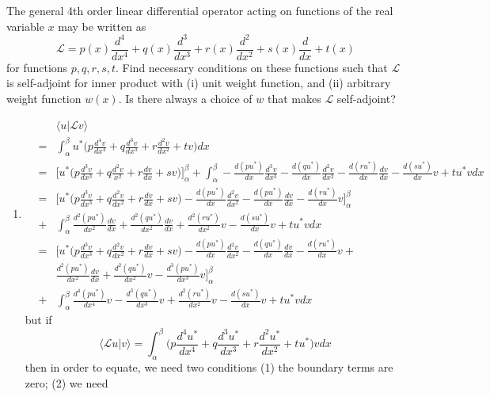 \documentclass[a4paper]{article}
\begin{document}
\begin{qns}
The general 4th order linear differential operator acting on functions of the real variable $x$ may be written as
$$\mathcal{L}=p(x)\frac{d^4}{dx^4}+q(x)\frac{d^3}{dx^3}+r(x)\frac{d^2}{dx^2}+s(x)\frac{d}{dx}+t(x)$$
for functions $p,q,r,s,t$. Find necessary conditions on these functions such that $\mathcal{L}$ is self-adjoint for inner product with (i) unit weight function, and (ii) arbitrary weight function $w(x)$. Is there always a choice of $w$ that makes $\mathcal{L}$ self-adjoint?
\end{qns}
\begin{ans}\leavevmode
\begin{enumerate}[label=(\roman*)]
\item
\begin{eqnarray}
& &\langle u|\mathcal{L}v\rangle\nonumber\\&=&\int_\alpha^\beta u^*\bigg(p\frac{d^4v}{dx^4}+q\frac{d^3v}{dx^3}+r\frac{d^2v}{dx^2}+tv\bigg)dx\nonumber\\&=&\bigg[u^*\bigg(p\frac{d^3v}{dx^3}+q\frac{d^2v}{x^2}+r\frac{dv}{dx}+sv\bigg)\bigg]_\alpha^\beta+\int_\alpha^\beta-\frac{d(pu^*)}{dx}\frac{d^3v}{dx^3}-\frac{d(qu^*)}{dx}\frac{d^2v}{dx^2}-\frac{d(ru^*)}{dx}\frac{dv}{dx}-\frac{d(su^*)}{dx}v+tu^*vdx\nonumber\\&=&\bigg[u^*\bigg(p\frac{d^3v}{dx^3}+q\frac{d^2v}{dx^2}+r\frac{dv}{dx}+sv\bigg)-\frac{d(pu^*)}{dx}\frac{d^2v}{dx^2}-\frac{d(pu^*)}{dx}\frac{dv}{dx}-\frac{d(ru^*)}{dx}v\bigg]_\alpha^\beta\nonumber\\&+&\int_\alpha^\beta\frac{d^2(pu^*)}{dx^2}\frac{dv}{dx}+\frac{d^2(qu^*)}{dx^2}\frac{dv}{dx}+\frac{d^2(ru^*)}{dx^2}v-\frac{d(su^*)}{dx}v+tu^*vdx\nonumber\\&=&\bigg[u^*\bigg(p\frac{d^3v}{dx^3}+q\frac{d^2v}{dx^2}+r\frac{dv}{dx}+sv\bigg)-\frac{d(pu^*)}{dx}\frac{d^2v}{dx^2}-\frac{d(qu^*)}{dx}\frac{dv}{dx}-\frac{d(ru^*)}{dx}v+\nonumber\\&&\frac{d^2(pu^*)}{dx^2}\frac{dv}{dx}+\frac{d^2(qu^*)}{dx^2}v-\frac{d^3(pu^*)}{dx^3}v\bigg]_\alpha^\beta\nonumber\\&+&\int_\alpha^\beta\frac{d^4(pu^*)}{dx^4}v-\frac{d^3(qu^*)}{dx^3}v+\frac{d^2(ru^*)}{dx^2}v-\frac{d(su^*)}{dx}v+tu^*vdx\nonumber
\end{eqnarray}
but if
$$\langle\mathcal{L}u|v\rangle=\int_\alpha^\beta\bigg(p\frac{d^4u^*}{dx^4}+q\frac{d^3u^*}{dx^3}+r\frac{d^2u^*}{dx^2}+tu^*\bigg)vdx$$
then in order to equate, we need two conditions (1) the boundary terms are zero; (2) we need

\end{enumerate}
\end{ans}
\end{document}
